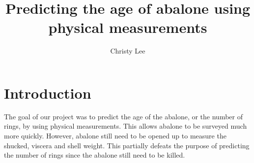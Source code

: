 \documentclass[a4paper,9pt,twocolumn,twoside,]{pinp}
\title{Predicting the age of abalone using physical measurements}
\author[a]{Christy Lee}
\author[]{}
\author[]{}
\begin{document}
\verticaladjustment{-2pt}

\maketitle
\thispagestyle{firststyle}



\makeatletter
\let\oldlt\longtable
\let\endoldlt\endlongtable
\def\longtable{\@ifnextchar[\longtable@i \longtable@ii}
\def\longtable@i[#1]{\begin{figure}[t]
\onecolumn
\begin{minipage}{0.5\textwidth}
\oldlt[#1]
}
\def\longtable@ii{\begin{figure}[t]
\onecolumn
\begin{minipage}{0.5\textwidth}
\oldlt
}
\def\endlongtable{\endoldlt
\end{minipage}
\twocolumn
\end{figure}}
\makeatother

\hypertarget{introduction}{%
\section{Introduction}\label{introduction}}

The goal of our project was to predict the age of the abalone, or the
number of rings, by using physical measurements. This allows abalone to
be surveyed much more quickly. However, abalone still need to be opened
up to measure the shucked, viscera and shell weight. This partially
defeats the purpose of predicting the number of rings since the abalone
still need to be killed.
\end{document}
